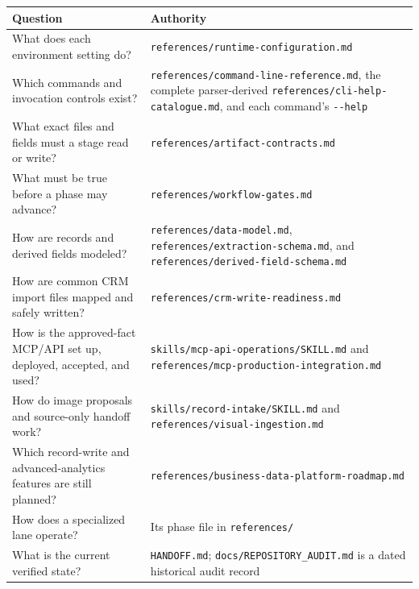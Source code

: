 \documentclass[
]{article}
\newcounter{none} %
\begin{document}
{\def\LTcaptype{none} %
\begin{longtable}[]{@{}
  >{\raggedright\arraybackslash}p{}
  >{\raggedright\arraybackslash}p{}@{}}
\toprule\noalign{}
\begin{minipage}[b]{\linewidth}\raggedright
Question
\end{minipage} & \begin{minipage}[b]{\linewidth}\raggedright
Authority
\end{minipage} \\
\midrule\noalign{}
\endhead
\bottomrule\noalign{}
\endlastfoot
What does each environment setting do? &
\texttt{references/\allowbreak{}runtime-\allowbreak{}configuration.md} \\
Which commands and invocation controls exist? &
\texttt{references/\allowbreak{}command-\allowbreak{}line-\allowbreak{}reference.md},
the complete parser-derived
\texttt{references/\allowbreak{}cli-\allowbreak{}help-\allowbreak{}catalogue.md},
and each command's \texttt{-\/-help} \\
What exact files and fields must a stage read or write? &
\texttt{references/\allowbreak{}artifact-\allowbreak{}contracts.md} \\
What must be true before a phase may advance? &
\texttt{references/\allowbreak{}workflow-\allowbreak{}gates.md} \\
How are records and derived fields modeled? &
\texttt{references/\allowbreak{}data-\allowbreak{}model.md},
\texttt{references/\allowbreak{}extraction-\allowbreak{}schema.md}, and
\texttt{references/\allowbreak{}derived-\allowbreak{}field-\allowbreak{}schema.md} \\
How are common CRM import files mapped and safely written? &
\texttt{references/\allowbreak{}crm-\allowbreak{}write-\allowbreak{}readiness.md} \\
How is the approved-fact MCP/API set up, deployed, accepted, and used? &
\texttt{skills/\allowbreak{}mcp-\allowbreak{}api-\allowbreak{}operations/\allowbreak{}SKILL.md}
and
\texttt{references/\allowbreak{}mcp-\allowbreak{}production-\allowbreak{}integration.md} \\
How do image proposals and source-only handoff work? &
\texttt{skills/\allowbreak{}record-\allowbreak{}intake/\allowbreak{}SKILL.md}
and \texttt{references/\allowbreak{}visual-\allowbreak{}ingestion.md} \\
Which record-write and advanced-analytics features are still planned? &
\texttt{references/\allowbreak{}business-\allowbreak{}data-\allowbreak{}platform-\allowbreak{}roadmap.md} \\
How does a specialized lane operate? & Its phase file in
\texttt{references/\allowbreak{}} \\
What is the current verified state? & \texttt{HANDOFF.md};
\texttt{docs/\allowbreak{}REPOSITORY\_\allowbreak{}AUDIT.md} is a dated
historical audit record \\
\end{longtable}
}
\end{document}
